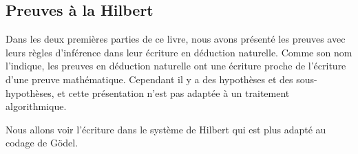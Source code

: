 \documentclass[11pt,class=report,crop=false]{standalone}
\begin{document}
\subsection{Preuves à la Hilbert}


Dans les deux premières parties de ce livre, nous avons présenté les preuves avec leurs règles d'inférence dans leur écriture en déduction naturelle.
Comme son nom l'indique, les preuves en déduction naturelle ont une écriture proche de l'écriture d'une preuve mathématique. 
Cependant il y a des hypothèses et des sous-hypothèses, et cette présentation n'est pas adaptée à un traitement algorithmique.

Nous allons voir l'écriture dans le système de Hilbert qui est plus adapté au codage de Gödel.
\end{document}
